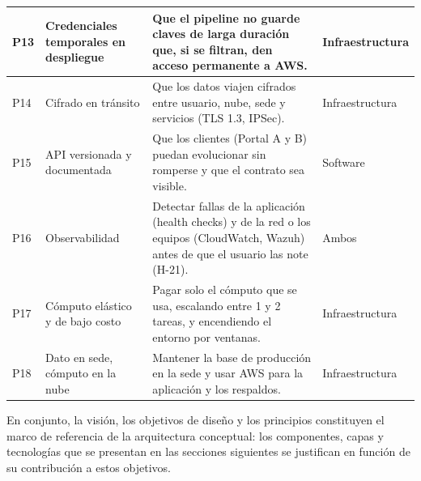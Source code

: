 \begin{longtable}{|>{\centering\arraybackslash}p{0.9cm}|>{\raggedright\arraybackslash}p{3.6cm}|>{\raggedright\arraybackslash}p{7.6cm}|>{\raggedright\arraybackslash}p{2.3cm}|}
\hline
P13 & Credenciales temporales en despliegue & Que el pipeline no guarde claves de larga duración que, si se filtran, den acceso permanente a AWS. & Infraestructura \\
\hline
P14 & Cifrado en tránsito & Que los datos viajen cifrados entre usuario, nube, sede y servicios (TLS 1.3, IPSec). & Infraestructura \\
\hline
P15 & API versionada y documentada & Que los clientes (Portal A y B) puedan evolucionar sin romperse y que el contrato sea visible. & Software \\
\hline
P16 & Observabilidad & Detectar fallas de la aplicación (health checks) y de la red o los equipos (CloudWatch, Wazuh) antes de que el usuario las note (H-21). & Ambos \\
\hline
P17 & Cómputo elástico y de bajo costo & Pagar solo el cómputo que se usa, escalando entre 1 y 2 tareas, y encendiendo el entorno por ventanas. & Infraestructura \\
\hline
P18 & Dato en sede, cómputo en la nube & Mantener la base de producción en la sede y usar AWS para la aplicación y los respaldos. & Infraestructura \\
\hline
\end{longtable}

En conjunto, la visión, los objetivos de diseño y los principios constituyen el marco de referencia de la arquitectura conceptual: los componentes, capas y tecnologías que se presentan en las secciones siguientes se justifican en función de su contribución a estos objetivos.
